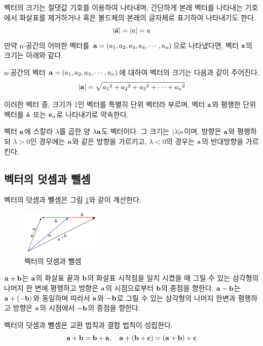 벡터의 크기는 절댓값 기호를 이용하여 나타내며, 간단하게 본래 벡터를 나타내는 기호에서 화살표를 제거하거나 혹은 볼드체의 본래의 글자체로 표기하여 나타내기도 한다.
$$\abs{\va{a}} = \abs{a} = a $$
만약 n-공간의 어떠한 벡터를 $\vb{a} = (a_1, a_2, a_3, a_4, \cdots, a_n)$으로 나타냈다면, 벡터 $\vb{a}$의 크기는 아래와 같다.

\begin{keypoint}
  n-공간의 벡터 $\vb{a} = (a_1, a_2, a_3, \cdots, a_n)$에 대하여 벡터의 크기는 다음과 같이 주어진다.
  $$\abs{\vb{a}} = \sqrt{{a_1}^2 + {a_2}^2 + {a_3}^2 + \cdots + {a_n}^2 }$$
\end{keypoint}

이러한 벡터 중, 크기가 1인 벡터를 특별히 단위 벡터라 부르며, 벡터 $\vb{a}$와 평행한 단위 벡터를 $\vu{a}$ 또는 $\vb{e}_a$로 나타내기로 약속한다.

벡터 $\vb{a}$에 스칼라 $\lambda$를 곱한 양 $\lambda\vb{a}$도 벡터이다. 그 크기는 $\abs{\lambda}a$이며, 방향은 $\vb{a}$와 평행하되 $\lambda>0$인 경우에는 $\vb{a}$와 같은 방향을 가르키고, $\lambda<0$의 경우는 $\vb{a}$의 반대방향을 가르킨다.

\subsection{벡터의 덧셈과 뺄셈}

벡터의 덧셈과 뺄셈은 그림 \ref{fig:addsubvector}와 같이 계산한다.

\begin{figure}
  \centering
  \includegraphics[width=0.34\textwidth]{images/fig1-2}
  \caption{벡터의 덧셈과 뺄셈}
  \label{fig:addsubvector}
\end{figure}

$\vb{a} + \vb{b}$는 $\vb{a}$의 화살표 끝과 $\vb{b}$의 화살표 시작점을 일치 시켰을 때 그릴 수 있는 삼각형의 나머지 한 변에 평행하고 방향은 $\vb{a}$의 시점으로부터 $\vb{b}$의 종점을 향한다. $\vb{a} - \vb{b}$는 $\vb{a} + (-\vb{b})$와 동일하며 따라서 $\vb{a}$와 $-\vb{b}$로 그릴 수 있는 삼각형의 나머지 한변과 평행하고 방향은 $\vb{a}$의 시점에서 $-\vb{b}$의 종점을 향한다.

벡터의 덧셈과 뺄셈은 교환 법칙과 결합 법칙이 성립한다.
$$\vb{a} + \vb{b} = \vb{b} +\vb{a}, \quad \vb{a} + (\vb{b} + \vb{c}) = (\vb{a} + \vb{b}) + \vb{c}$$


